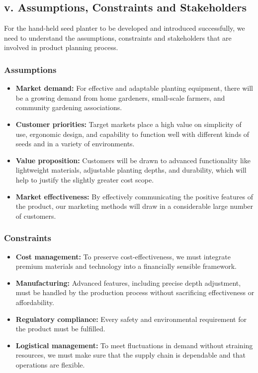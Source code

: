 \subsection*{v. Assumptions, Constraints and Stakeholders}
For the hand-held seed planter to be developed and introduced successfully, we need to understand the assumptions, constraints and stakeholders that are involved in product planning process.

\subsubsection*{Assumptions}
\begin{itemize}
    \item \textbf{Market demand:} For effective and adaptable planting equipment, there will be a growing demand from home gardeners, small-scale farmers, and community gardening associations.
    \item \textbf{Customer priorities:} Target markets place a high value on simplicity of use, ergonomic design, and capability to function well with different kinds of seeds and in a variety of environments.
    \item \textbf{Value proposition:} Customers will be drawn to advanced functionality like lightweight materials, adjustable planting depths, and durability, which will help to justify the slightly greater cost scope.
    \item \textbf{Market effectiveness:} By effectively communicating the positive features of the product, our marketing methods will draw in a considerable large number of customers.
\end{itemize}

\subsubsection*{Constraints}
\begin{itemize}
    \item \textbf{Cost management:} To preserve cost-effectiveness, we must integrate premium materials and technology into a financially sensible framework.
    \item \textbf{Manufacturing:} Advanced features, including precise depth adjustment, must be handled by the production process without sacrificing effectiveness or affordability.
    \item \textbf{Regulatory compliance:} Every safety and environmental requirement for the product must be fulfilled.
    \item \textbf{Logistical management:} To meet fluctuations in demand without straining resources, we must make sure that the supply chain is dependable and that operations are flexible.
\end{itemize}

